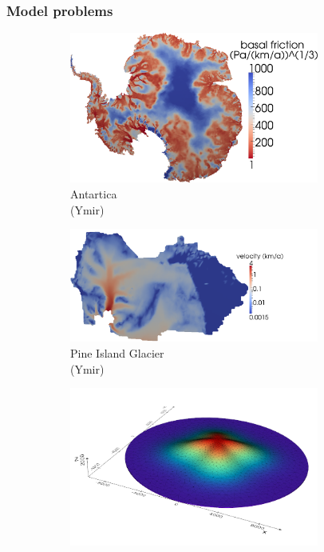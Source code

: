 \documentclass[10pt,final,xcolor=dvipsnames]{beamer}
\begin{document}
\begin{frame}
	\frametitle{Model problems}
	\begin{figure}
		\centering
		\begin{subfigure}[b]{0.49\textwidth}
			\centering
			\includegraphics[width=0.9\textwidth]{beta_cube_cut.png}
			\caption{Antartica\\(Ymir)}
		\end{subfigure}
		\hfill
		\begin{subfigure}[b]{0.49\textwidth}
			\centering
			\includegraphics[width=0.9\textwidth]{pig_uobs_uqice.png}
			\caption{Pine Island Glacier\\(Ymir)}
		\end{subfigure}
		\hfill
		\begin{subfigure}[b]{0.49\textwidth}
			\centering
			\includegraphics[width=0.9\textwidth]{Mesh_Height.png}

\end{subfigure}
\end{figure}
\end{frame}
\end{document}
